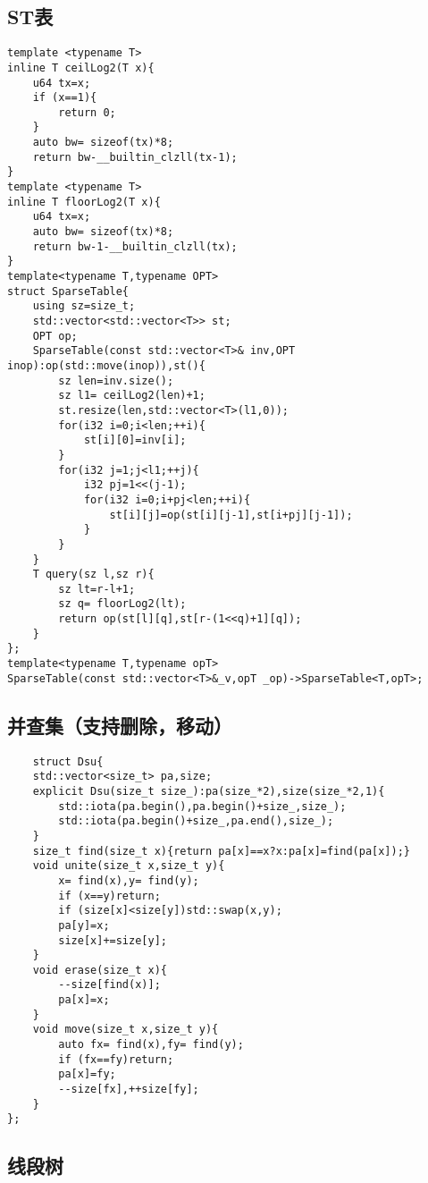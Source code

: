 \documentclass[UTF8]{ctexart}
\begin{document}
\subsection{ST表}
\begin{lstlisting}
template <typename T>
inline T ceilLog2(T x){
    u64 tx=x;
    if (x==1){
        return 0;
    }
    auto bw= sizeof(tx)*8;
    return bw-__builtin_clzll(tx-1);
}
template <typename T>
inline T floorLog2(T x){
    u64 tx=x;
    auto bw= sizeof(tx)*8;
    return bw-1-__builtin_clzll(tx);
}
template<typename T,typename OPT>
struct SparseTable{
    using sz=size_t;
    std::vector<std::vector<T>> st;
    OPT op;
    SparseTable(const std::vector<T>& inv,OPT inop):op(std::move(inop)),st(){
        sz len=inv.size();
        sz l1= ceilLog2(len)+1;
        st.resize(len,std::vector<T>(l1,0));
        for(i32 i=0;i<len;++i){
            st[i][0]=inv[i];
        }
        for(i32 j=1;j<l1;++j){
            i32 pj=1<<(j-1);
            for(i32 i=0;i+pj<len;++i){
                st[i][j]=op(st[i][j-1],st[i+pj][j-1]);
            }
        }
    }
    T query(sz l,sz r){
        sz lt=r-l+1;
        sz q= floorLog2(lt);
        return op(st[l][q],st[r-(1<<q)+1][q]);
    }
};
template<typename T,typename opT>
SparseTable(const std::vector<T>&_v,opT _op)->SparseTable<T,opT>;
\end{lstlisting}
\subsection{并查集（支持删除，移动）}
\begin{lstlisting}
    struct Dsu{
    std::vector<size_t> pa,size;
    explicit Dsu(size_t size_):pa(size_*2),size(size_*2,1){
        std::iota(pa.begin(),pa.begin()+size_,size_);
        std::iota(pa.begin()+size_,pa.end(),size_);
    }
    size_t find(size_t x){return pa[x]==x?x:pa[x]=find(pa[x]);}
    void unite(size_t x,size_t y){
        x= find(x),y= find(y);
        if (x==y)return;
        if (size[x]<size[y])std::swap(x,y);
        pa[y]=x;
        size[x]+=size[y];
    }
    void erase(size_t x){
        --size[find(x)];
        pa[x]=x;
    }
    void move(size_t x,size_t y){
        auto fx= find(x),fy= find(y);
        if (fx==fy)return;
        pa[x]=fy;
        --size[fx],++size[fy];
    }
};
\end{lstlisting}
\subsection{线段树}
\end{document}
